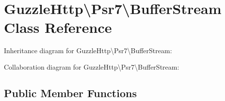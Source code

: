 \hypertarget{classGuzzleHttp_1_1Psr7_1_1BufferStream}{}\section{Guzzle\+Http\textbackslash{}Psr7\textbackslash{}Buffer\+Stream Class Reference}
\label{classGuzzleHttp_1_1Psr7_1_1BufferStream}


Inheritance diagram for Guzzle\+Http\textbackslash{}Psr7\textbackslash{}Buffer\+Stream\+:


Collaboration diagram for Guzzle\+Http\textbackslash{}Psr7\textbackslash{}Buffer\+Stream\+:
\subsection*{Public Member Functions}
